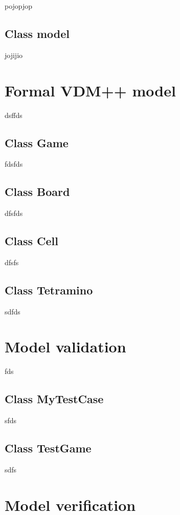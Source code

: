 \documentclass[a4paper]{article}
\begin{document}
pojopjop

\subsection{Class model}

jojijio

\section{Formal VDM++ model}

dsffds

\subsection{Class Game}

fdsfds

\subsection{Class Board}

dfsfds

\subsection{Class Cell}

dfsfs

\subsection{Class Tetramino}

sdfds

\section{Model validation}

fds

\subsection{Class MyTestCase} 

sfds

\subsection{Class TestGame} 

sdfs

\section{Model verification}
\end{document}
